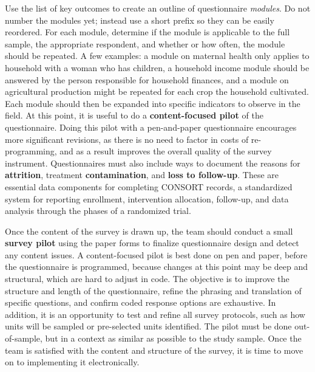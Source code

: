 Use the list of key outcomes to create an outline of questionnaire \textit{modules}.
Do not number the modules yet; instead use a short prefix so they can be easily reordered.
For each module, determine if the module is applicable to the full sample,
the appropriate respondent, and whether or how often, the module should be repeated.
A few examples: a module on maternal health only applies to household with a woman who has children,
a household income module should be answered by the person responsible for household finances,
and a module on agricultural production might be repeated for each crop the household cultivated.
Each module should then be expanded into specific indicators to observe in the field.
At this point, it is useful to do a  \textbf{content-focused pilot}
of the questionnaire.
Doing this pilot with a pen-and-paper questionnaire encourages more significant revisions,
as there is no need to factor in costs of re-programming,
and as a result improves the overall quality of the survey instrument.
Questionnaires must also include ways to document the reasons for \textbf{attrition},
treatment \textbf{contamination}, and \textbf{loss to follow-up}.
These are essential data components for completing CONSORT records,
a standardized system for reporting enrollment, intervention allocation, follow-up,
and data analysis through the phases of a randomized trial.\cite{begg1996improving}

Once the content of the survey is drawn up,
the team should conduct a small \textbf{survey pilot}
using the paper forms to finalize questionnaire design and detect any content issues.
A content-focused pilot
is best done on pen and paper, before the questionnaire is programmed,
because changes at this point may be deep and structural, which are hard to adjust in code.
The objective is to improve the structure and length of the questionnaire,
refine the phrasing and translation of specific questions,
and confirm coded response options are exhaustive.
In addition, it is an opportunity to test and refine all survey protocols,
such as how units will be sampled or pre-selected units identified.
The pilot must be done out-of-sample,
but in a context as similar as possible to the study sample.
Once the team is satisfied with the content and structure of the survey,
it is time to move on to implementing it electronically.

